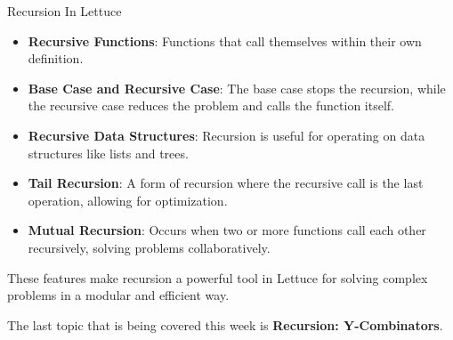 \begin{notes}{Recursion In Lettuce}
\begin{highlight}
        \begin{itemize}
            \item \textbf{Recursive Functions}: Functions that call themselves within their own definition.
            \item \textbf{Base Case and Recursive Case}: The base case stops the recursion, while the recursive case reduces the problem and calls the function itself.
            \item \textbf{Recursive Data Structures}: Recursion is useful for operating on data structures like lists and trees.
            \item \textbf{Tail Recursion}: A form of recursion where the recursive call is the last operation, allowing for optimization.
            \item \textbf{Mutual Recursion}: Occurs when two or more functions call each other recursively, solving problems collaboratively.
        \end{itemize}
    
        These features make recursion a powerful tool in Lettuce for solving complex problems in a modular and efficient way.
    
    \end{highlight}
\end{notes}

The last topic that is being covered this week is \textbf{Recursion: Y-Combinators}.

